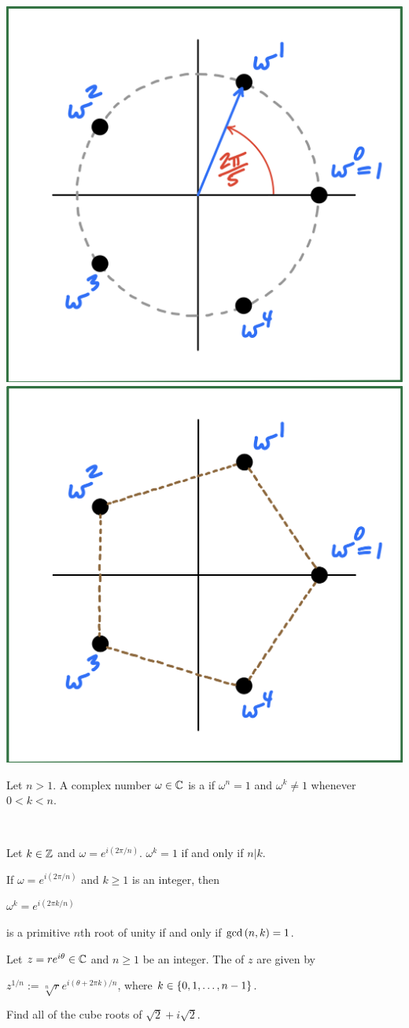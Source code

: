 \documentclass[11pt,fleqn,dvipsnames,usenames]{article}
\begin{document}
\begin{center}
\includegraphics[width=0.3\linewidth]{fifthrootsunity}\hspace{4cm} \includegraphics[width=0.3\linewidth]{fifthrootsunityhexagon}
\end{center}
%
\begin{definition*} Let $n> 1$.  A complex number $\omega\in\mathbb{C}$ is a  if $\omega^{n} = 1$ and $\omega^{k}\neq 1$ whenever $0 < k < n$.
\end{definition*}
%
\begin{examples*}~
\end{examples*}
\newpage

\begin{lemma*}
Let $k\in\mathbb{Z}$ and $\omega = e^{i(2\pi/n)}$.  $\omega^{k} = 1$ if and only if $n|k$.
\end{lemma*}
%
\prf
\vspace{6cm}
%

\begin{theorem*}
If $\omega = e^{i(2\pi/n)}$ and $k\geq 1$ is an integer, then
\begin{center}
$\omega^{k} = e^{i(2\pi k/n)}$
\end{center}
is a primitive $n$th root of unity if and only if $\text{gcd}\left(n,k\right) = 1$.
\end{theorem*}
\vsp

%
\begin{definition*}
Let $z = re^{i\theta}\in \mathbb{C}$ and $n\geq 1$ be an integer. The  of $z$ are given by
\begin{center}
$z^{1/n} := \sqrt[n]{r}e^{i(\theta + 2\pi k)/n}$, where $k\in\left\{0, 1, \ldots, n -1\right\}$.
\end{center}
\end{definition*}
%
\begin{example*}
Find all of the cube roots of $\sqrt{2} + i\sqrt{2}$.
\end{example*}
%
\begin{solution}
\end{solution}
\newpage
\end{document}
